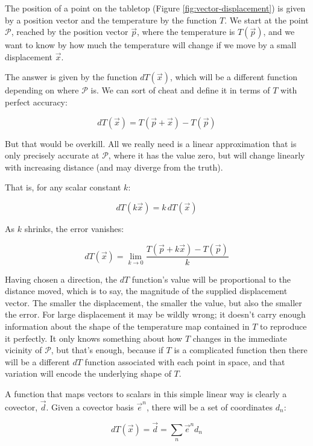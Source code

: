 The position of a point on the tabletop (Figure \ref{fig:vector-displacement}) is given by a position vector and the temperature by the function $T$. We start at the point $\mathcal{P}$, reached by the position vector $\vec{p}$, where the temperature is $T(\vec{p})$, and we want to know by how much the temperature will change if we move by a small displacement $\vec{x}$.

The answer is given by the function $dT(\vec{x})$, which will be a different function depending on where $\mathcal{P}$ is. We can sort of cheat and define it in terms of $T$ with perfect accuracy:

$$
dT(\vec{x}) = T(\vec{p} + \vec{x}) - T(\vec{p})
$$

But that would be overkill. All we really need is a linear approximation that is only precisely accurate at $\mathcal{P}$, where it has the value zero, but will change linearly with increasing distance (and may diverge from the truth). 

That is, for any scalar constant $k$:

$$
dT(k \vec{x}) = k \, dT(\vec{x})
$$

As $k$ shrinks, the error vanishes:

\begin{equation}
    dT(\vec{x}) = \lim_{k \to 0} \frac{T(\vec{p} + k\vec{x}) - T(\vec{p})}{k}
    \label{eqn:directional-derivative-limit}
\end{equation}

Having chosen a direction, the $dT$ function's value will be proportional to the distance moved, which is to say, the magnitude of the supplied displacement vector. The smaller the displacement, the smaller the value, but also the smaller the error. For large displacement it may be wildly wrong; it doesn't carry enough information about the shape of the temperature map contained in $T$ to reproduce it perfectly. It only knows something about how $T$ changes in the immediate vicinity of $\mathcal{P}$, but that's enough, because if $T$ is a complicated function then there will be a different $dT$ function associated with each point in space, and that variation will encode the underlying shape of $T$.

A function that maps vectors to scalars in this simple linear way is clearly a covector, $\vec{d}$. Given a covector basis $\vec{e}^n$, there will be a set of coordinates $d_n$:

\begin{equation}
    dT(\vec{x}) = \vec{d} = \sum_n \vec{e}^n d_n
    \label{eqn:covector-directional-derivative}
\end{equation}

